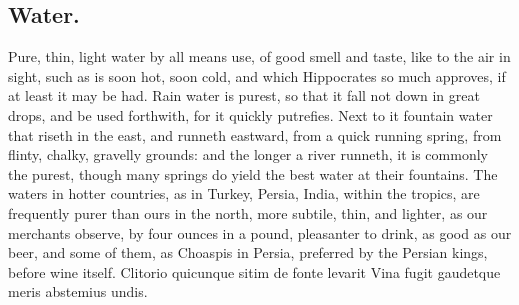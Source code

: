 {\subsection{Water.}
Pure, thin, light water by all means use, of good smell and
taste, like to the air in sight, such as is soon hot, soon cold, and
which Hippocrates so much approves, if at least it may be had. Rain
water is purest, so that it fall not down in great drops, and be used
forthwith, for it quickly putrefies. Next to it fountain water that
riseth in the east, and runneth eastward, from a quick running spring,
from flinty, chalky, gravelly grounds: and the longer a river runneth,
it is commonly the purest, though many springs do yield the best water
at their fountains. The waters in hotter countries, as in Turkey,
Persia, India, within the tropics, are frequently purer than ours in
the north, more subtile, thin, and lighter, as our merchants observe,
by four ounces in a pound, pleasanter to drink, as good as our beer,
and some of them, as Choaspis in Persia, preferred by the Persian
kings, before wine itself.
Clitorio quicunque sitim de fonte levarit
Vina fugit gaudetque meris abstemius undis.

}
